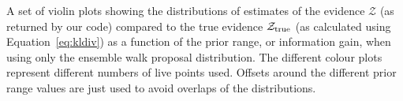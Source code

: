 \label{fig:walkpropevs}
A set of violin plots showing the distributions of estimates of the evidence
$\mathcal{Z}$ (as returned by our code) compared to the true evidence $\mathcal{Z}_{\rm true}$ (as
calculated using Equation~\ref{eq:kldiv}) as a function of the prior range,
or information gain, when using only the ensemble walk proposal
distribution. The different colour plots represent different numbers
of live points used. Offsets around the different prior range values are just used to avoid overlaps of the
distributions.
